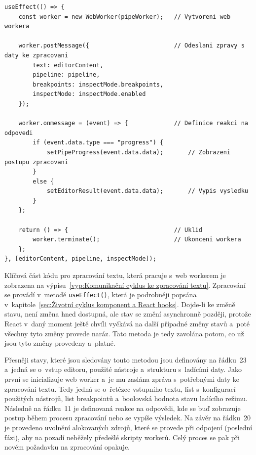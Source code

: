 \begin{lstlisting}[caption={Komunikační cyklus zpracování textu. Na začátku je vytvořena instance web workera, kterému je zaslána zpráva s~potřebnými daty ke zpracování. Následně je definované chování na příchozí odpovědi. V poslední fázi je provedeno jeho ukončení.}, label={vyp:Komunikační cyklus ke zpracování textu}]
useEffect(() => {
    const worker = new WebWorker(pipeWorker);   // Vytvoreni web workera

    worker.postMessage({                        // Odeslani zpravy s daty ke zpracovani
        text: editorContent, 
        pipeline: pipeline, 
        breakpoints: inspectMode.breakpoints, 
        inspectMode: inspectMode.enabled
    });

    worker.onmessage = (event) => {             // Definice reakci na odpovedi
        if (event.data.type === "progress") {
            setPipeProgress(event.data.data);       // Zobrazeni postupu zpracovani
        }
        else {
            setEditorResult(event.data.data);       // Vypis vysledku
        }
    };

    return () => {                              // Uklid
        worker.terminate();                     // Ukonceni workera
    };
}, [editorContent, pipeline, inspectMode]);
\end{lstlisting}
Klíčová část kódu pro zpracování textu, která pracuje s~web workerem je zobrazena na výpisu~\ref{vyp:Komunikační cyklus ke zpracování textu}. Zpracování se provádí v~metodě \texttt{useEffect()}, která je podrobněji popsána v~kapitole~\ref{sec:Životní cyklus komponent a React hooks}. Dojde-li ke změně stavu, není změna hned dostupná, ale stav se změní asynchronně později, protože React v~daný moment ještě chvíli vyčkává na další případné změny stavů a~poté všechny tyto změny provede naráz. Tato metoda je tedy zavolána potom, co už jsou tyto změny provedeny a~platné.

Přesněji stavy, které jsou sledovány touto metodou jsou definovány na řádku~23 a~jedná se o~vstup editoru, použité nástroje a~strukturu s~ladícími daty. Jako první se inicializuje web worker a~je mu zaslána zpráva s~potřebnými daty ke zpracování textu. Tedy jedná se o~řetězec vstupního textu, list s~konfigurací použitých nástrojů, list breakpointů a~boolovská hodnota stavu ladícího režimu. Následně na řádku~11 je definovaná reakce na odpovědi, kde se buď zobrazuje postup během procesu zpracování nebo se vypíše výsledek. Na závěr na řádku~20 je provedeno uvolnění alokovaných zdrojů, které se provede při odpojení (poslední fázi), aby na pozadí neběžely předešlé skripty workerů. Celý proces se pak při novém požadavku na zpracování opakuje.

